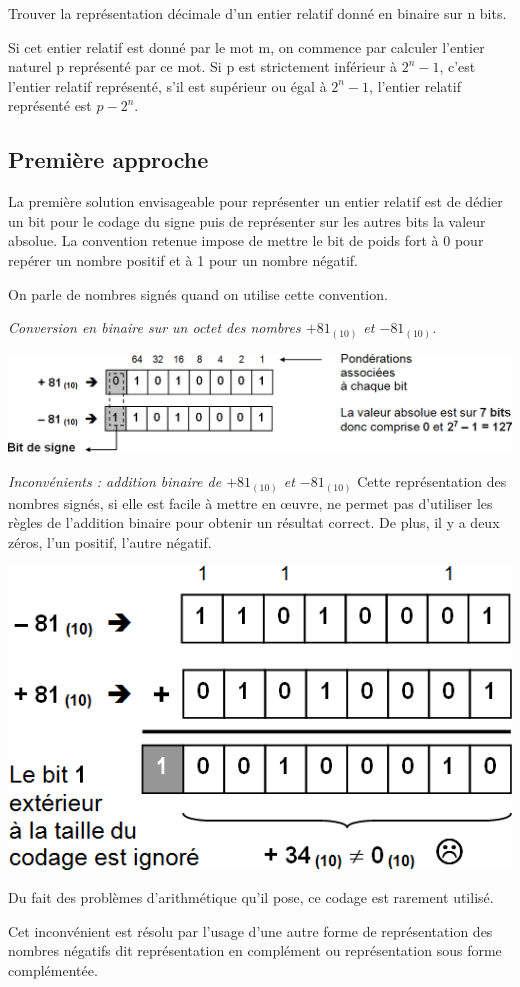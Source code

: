 \documentclass[10pt,fleqn]{article} %
\begin{document}
\begin{savoir}
Trouver la représentation décimale d’un entier relatif donné en binaire sur n bits.

Si cet entier relatif est donné par le mot m, on commence par calculer l’entier naturel
p représenté par ce mot. Si p est strictement inférieur à $2^n-1$, c’est l’entier relatif
représenté, s’il est supérieur ou égal à $2^n-1$, l’entier relatif représenté est $p-2^n$.
\end{savoir}


\subsection{Première approche}
La première solution envisageable pour représenter un entier relatif est de dédier un bit pour le codage du signe puis de représenter sur les autres bits la valeur absolue. La convention retenue impose de mettre le bit de poids fort à 0 pour repérer un nombre positif et à 1 pour un nombre négatif. 

On parle de nombres signés quand on utilise cette convention.

\begin{exemple}
\textit{Conversion en binaire sur un octet des nombres $+81_{(10)}$ et $-81_{(10)}$.}


\begin{center}
\includegraphics[width=.7\textwidth]{images/entier_relatif}
\end{center}

\end{exemple}

\begin{rem}
\textit{Inconvénients : addition binaire de $+81_{(10)}$ et $-81_{(10)}$}
Cette représentation des nombres signés, si elle est facile à mettre en œuvre, ne permet pas d’utiliser les règles de l’addition binaire pour obtenir un résultat correct. De plus, il y a deux zéros, l’un positif, l’autre négatif.

\begin{center}
\includegraphics[width=.35\textwidth]{images/entier_relatif_2}
\end{center}

Du fait des problèmes d’arithmétique qu’il pose, ce codage est rarement utilisé.

Cet inconvénient est résolu par l’usage d’une autre forme de représentation des nombres négatifs dit représentation en complément ou représentation sous forme complémentée.

\end{rem}
\end{document}
